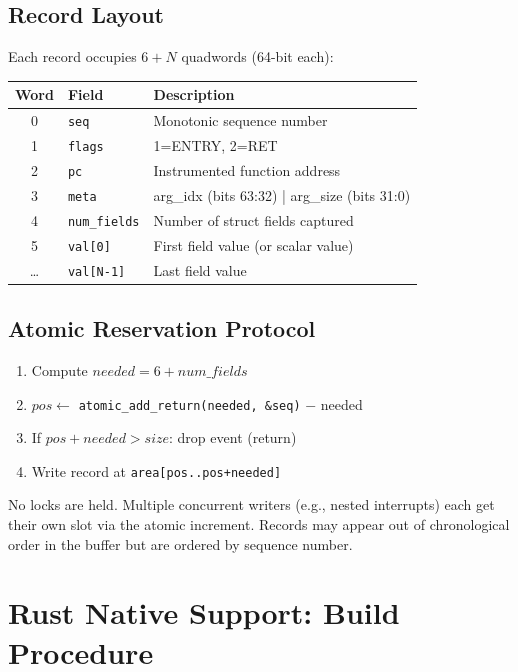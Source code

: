 \documentclass{ndss}
\begin{document}
\subsection{Record Layout}

Each record occupies $6 + N$ quadwords (64-bit each):

\begin{center}
\small
\begin{tabular}{|c|l|p{4.5cm}|}
\hline
\textbf{Word} & \textbf{Field} & \textbf{Description} \\
\hline
0 & \texttt{seq} & Monotonic sequence number \\
1 & \texttt{flags} & 1=ENTRY, 2=RET \\
2 & \texttt{pc} & Instrumented function address \\
3 & \texttt{meta} & arg\_idx (bits 63:32) | arg\_size (bits 31:0) \\
4 & \texttt{num\_fields} & Number of struct fields captured \\
5 & \texttt{val[0]} & First field value (or scalar value) \\
\ldots & \texttt{val[N-1]} & Last field value \\
\hline
\end{tabular}
\end{center}

\subsection{Atomic Reservation Protocol}

\begin{enumerate}[nosep]
  \item Compute $\mathit{needed} = 6 + \mathit{num\_fields}$
  \item $\mathit{pos} \gets$ \texttt{atomic\_add\_return(needed, \&seq)} $-$ needed
  \item If $\mathit{pos} + \mathit{needed} > \mathit{size}$: drop event (return)
  \item Write record at \texttt{area[pos..pos+needed]}
\end{enumerate}

No locks are held. Multiple concurrent writers (e.g., nested interrupts) each
get their own slot via the atomic increment. Records may appear out of
chronological order in the buffer but are ordered by sequence number.

\section{Rust Native Support: Build Procedure}\label{app:rust}
\end{document}
